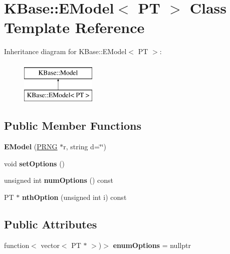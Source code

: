 \hypertarget{class_k_base_1_1_e_model}{\section{K\-Base\-:\-:E\-Model$<$ P\-T $>$ Class Template Reference}
\label{class_k_base_1_1_e_model}
}
Inheritance diagram for K\-Base\-:\-:E\-Model$<$ P\-T $>$\-:\begin{figure}[H]
\begin{center}
\leavevmode
\includegraphics[height=2.000000cm]{class_k_base_1_1_e_model}
\end{center}
\end{figure}
\subsection*{Public Member Functions}
\begin{DoxyCompactItemize}
\item 
\hypertarget{class_k_base_1_1_e_model_ac8acff3476069856a092599f797046f8}{{\bfseries E\-Model} (\hyperlink{class_k_base_1_1_p_r_n_g}{P\-R\-N\-G} $\ast$r, string d=\char`\"{}\char`\"{})}\label{class_k_base_1_1_e_model_ac8acff3476069856a092599f797046f8}

\item 
\hypertarget{class_k_base_1_1_e_model_aca2a35d8e8f23000a47e4d92fce26690}{void {\bfseries set\-Options} ()}\label{class_k_base_1_1_e_model_aca2a35d8e8f23000a47e4d92fce26690}

\item 
\hypertarget{class_k_base_1_1_e_model_a19063b42bcf8aa958684c2fe5eca04b7}{unsigned int {\bfseries num\-Options} () const }\label{class_k_base_1_1_e_model_a19063b42bcf8aa958684c2fe5eca04b7}

\item 
\hypertarget{class_k_base_1_1_e_model_a74f1728c3983329b50bec0deb484d366}{P\-T $\ast$ {\bfseries nth\-Option} (unsigned int i) const }\label{class_k_base_1_1_e_model_a74f1728c3983329b50bec0deb484d366}

\end{DoxyCompactItemize}
\subsection*{Public Attributes}
\begin{DoxyCompactItemize}
\item 
\hypertarget{class_k_base_1_1_e_model_ad117e0f01142f5a9beb4353145eb31f7}{function$<$ vector$<$ P\-T $\ast$ $>$)$>$ {\bfseries enum\-Options} = nullptr}\label{class_k_base_1_1_e_model_ad117e0f01142f5a9beb4353145eb31f7}

\end{DoxyCompactItemize}
